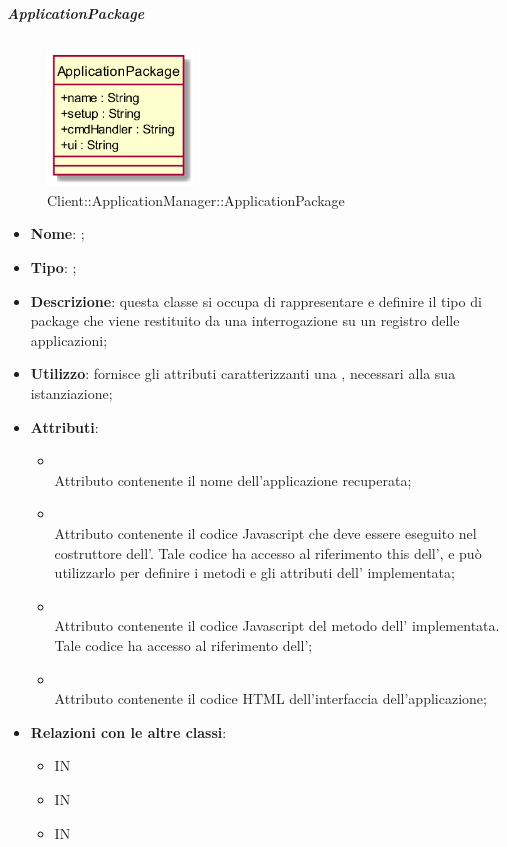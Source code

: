 \hypertarget{ApplicationPackage_label}{\subparagraph{ApplicationPackage}}
\begin{figure}[h]
	\centering
	\includegraphics[width=0.35\textwidth,height=\textheight,keepaspectratio]{images/ClassApplicationPackage.png}
	\caption{Client::ApplicationManager::ApplicationPackage}
\end{figure}
\begin{itemize}
	\item \textbf{Nome}: ;
	\item \textbf{Tipo}: ;
	\item \textbf{Descrizione}: questa classe si occupa di rappresentare e definire il tipo di package che viene restituito da una interrogazione su un registro delle applicazioni;
	\item \textbf{Utilizzo}: fornisce gli attributi caratterizzanti una , necessari alla sua istanziazione;
	\item \textbf{Attributi}:
	\begin{itemize}
		\item[]  \\
		Attributo contenente il nome dell'applicazione recuperata;
		\item[]  \\
		Attributo contenente il codice Javascript che deve essere eseguito nel costruttore dell'. Tale codice ha accesso al riferimento this dell', e può utilizzarlo per definire i metodi e gli attributi dell' implementata;
		\item[]  \\
		Attributo contenente il codice Javascript del metodo  dell' implementata. Tale codice ha accesso al riferimento  dell';
		\item[]  \\
		Attributo contenente il codice HTML dell'interfaccia dell'applicazione;
	\end{itemize}
	\item \textbf{Relazioni con le altre classi}:
	\begin{itemize}
		\item IN \hyperlink{Application_label}{}
		\item IN \hyperlink{<<interface>> ApplicationRegistryClient_label}{}
		\item IN \hyperlink{ApplicationLocalRegistry_label}{}
	\end{itemize}
\end{itemize}
\FloatBarrier

